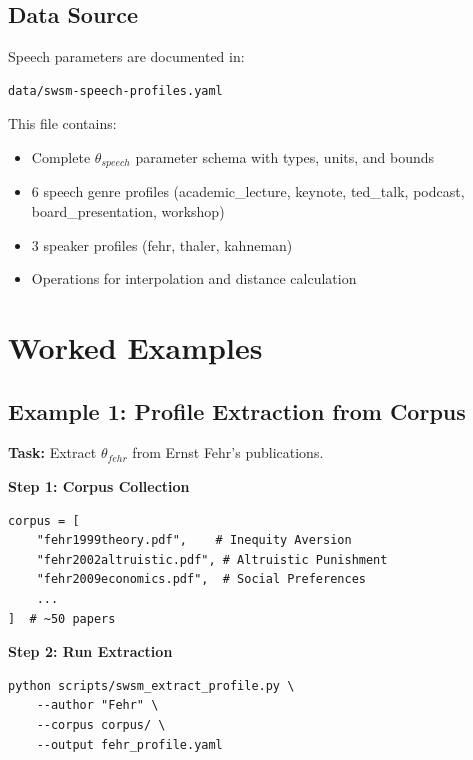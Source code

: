 \subsection{Data Source}
\label{sec:sw-speech-data}

Speech parameters are documented in:
\begin{verbatim}
data/swsm-speech-profiles.yaml
\end{verbatim}

This file contains:
\begin{itemize}
    \item Complete $\theta_{speech}$ parameter schema with types, units, and bounds
    \item 6 speech genre profiles (academic\_lecture, keynote, ted\_talk, podcast, board\_presentation, workshop)
    \item 3 speaker profiles (fehr, thaler, kahneman)
    \item Operations for interpolation and distance calculation
\end{itemize}


\section{Worked Examples}
\label{sec:sw-examples}

\subsection{Example 1: Profile Extraction from Corpus}
\label{sec:sw-ex1}

\textbf{Task:} Extract $\theta_{fehr}$ from Ernst Fehr's publications.

\textbf{Step 1: Corpus Collection}
\begin{verbatim}
corpus = [
    "fehr1999theory.pdf",    # Inequity Aversion
    "fehr2002altruistic.pdf", # Altruistic Punishment
    "fehr2009economics.pdf",  # Social Preferences
    ...
]  # ~50 papers
\end{verbatim}

\textbf{Step 2: Run Extraction}
\begin{verbatim}
python scripts/swsm_extract_profile.py \
    --author "Fehr" \
    --corpus corpus/ \
    --output fehr_profile.yaml
\end{verbatim}


